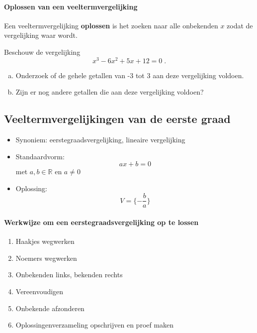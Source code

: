 \documentclass[12pt]{article}
\begin{document}
\begin{theorie}

\paragraph{Oplossen van een veeltermvergelijking}
\begin{mdframed}
  Een veeltermvergelijking {\bf oplossen} is het zoeken naar alle onbekenden $x$ zodat de vergelijking waar wordt.
\end{mdframed}

\end{theorie}

\begin{oefening}
  Beschouw de vergelijking
  $$x^3-6x^2+5x+12=0\;.$$
  \begin{enumerate}[(a)]
  \item Onderzoek of de gehele getallen van -3 tot 3 aan deze vergelijking voldoen.
  \item Zijn er nog andere getallen die aan deze vergelijking voldoen?
  \end{enumerate}
\end{oefening}

\begin{theorie}

\pagebreak
\subsection{Veeltermvergelijkingen van de eerste graad}

\begin{itemize}
\item Synoniem: eerstegraadsvergelijking, lineaire vergelijking
\item Standaardvorm:
  $$ax + b = 0$$
  met $a, b \in \mathbb{R}$ en $a\neq 0$
\item Oplossing:
  $$V=\{-\dfrac{b}{a}\}$$
\end{itemize}

\paragraph{Werkwijze om een eerstegraadsvergelijking op te lossen}
\begin{enumerate}
\item Haakjes wegwerken
\item Noemers wegwerken
\item Onbekenden links, bekenden rechts
\item Vereenvoudigen
\item Onbekende afzonderen
\item Oplossingenverzameling opschrijven en proef maken
\end{enumerate}

\end{theorie}
\end{document}
